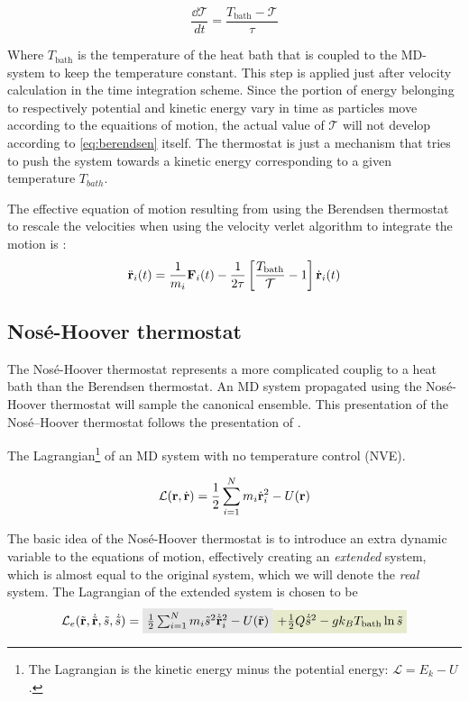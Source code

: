 \begin{equation}
\frac{\dd \mathcal{T}}{dt} = \frac{T_{\text{bath}}-\mathcal{T}}{\tau}
\label{eq:berendsen}
\end{equation}

Where $T_{\text{bath}}$ is the temperature of the heat bath that is coupled to the MD-system to keep the temperature constant. This step is applied just after velocity calculation in the time integration scheme. Since the portion of energy belonging to respectively potential and kinetic energy vary in time as particles move according to the equaitions of motion, the actual value of $\mathcal{T}$ will not develop according to \ref{eq:berendsen} itself. The thermostat is just a mechanism that tries to push the system towards a kinetic energy corresponding to a given temperature $T_{bath}$.

The effective equation of motion resulting from using the Berendsen thermostat to rescale the velocities when using the velocity verlet algorithm to integrate the motion is \cite[p.128]{Hunenberger2005}:
\begin{equation}
	\ddot{\mathbf{r}}_i(t) = \frac{1}{m_i} \mathbf{F}_i(t) - \frac{1}{2\tau}\left[ \frac{T_{\text{bath}}}{\mathcal{T}} -1 \right] \dot{\mathbf{r}}_i(t)
\end{equation} 

\subsection{Nosé-Hoover thermostat}
The Nosé-Hoover thermostat represents a more complicated couplig to a heat bath than the Berendsen thermostat. An MD system propagated using the Nosé-Hoover thermostat will sample the canonical ensemble. This presentation of the Nosé--Hoover thermostat follows the presentation of \citet{Hunenberger2005}.


The Lagrangian\footnote{The Lagrangian is the kinetic energy minus the potential energy: $\mathcal{L}=E_k - U$.} of an MD system with no temperature control (NVE).

\begin{equation}
	\mathcal{L}(\mathbf{r}, \dot{\mathbf{r}}) = \frac{1}{2} \sum_{i=1}^N m_i \dot{\mathbf{r}}_i^2 - U(\mathbf{r})
\end{equation}

The basic idea of the Nosé-Hoover thermostat is to introduce an extra dynamic variable to the equations of motion, effectively creating an \emph{extended} system, which is almost equal to the original system, which we will denote the \emph{real} system. The Lagrangian of the extended system is chosen to be
\begin{equation}
	\mathcal{L}_e(\tilde\rvec, \dot{\tilde\rvec}, \tilde{s}, \dot{\tilde s}) =
	\tikz[baseline] {
		\node [fill=gray!20, anchor=base] (t1) {$\frac{1}{2}\sum_{i=1}^N m_i \tilde s^2 \dot{\tilde\rvec}_i^2 - U(\tilde\rvec)$};
	}
	\tikz[baseline] {
		\node [fill=green!20, anchor=base] (t2) {$+ \frac{1}{2} Q \dot{\tilde s}^2 - gk_BT_{\text{bath}} \ln\tilde s $};
	}
\end{equation}

